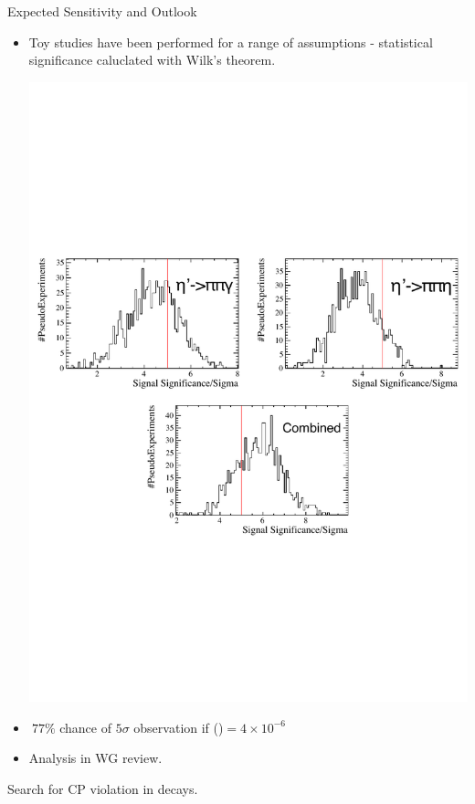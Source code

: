 \documentclass{beamer}
\def\LbpkEtapr {\decay{\Lb}{\proton\kaon\etapr}\xspace}
\begin{document}
\begin{frame}{Expected Sensitivity and Outlook}
  \begin{itemize}
  \item Toy studies have been performed for a range of \BF \xspace assumptions - statistical significance caluclated with Wilk's theorem.
    \begin{center}
      \includegraphics[width=.6\textwidth]{LbpketaprSensitivity.pdf}
    \end{center}
  \item $~77\%$ chance of $5\sigma$ observation if \BF(\LbpkEtapr)$=4\times10^{-6}$
  \item Analysis in WG review.
  \end{itemize}
\end{frame}

\begin{frame}
  \begin{block}{}
    \centering \Huge Search for CP violation in  decays.
  \end{block}
\end{frame}
\end{document}
